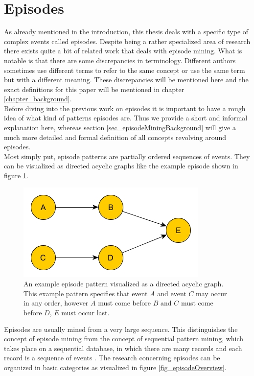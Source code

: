\section{Episodes}
\label{sec_episodes}
As already mentioned in the introduction, this thesis deals with a specific type of complex events called episodes. Despite being a rather specialized area of research there exists quite a bit of related work that deals with episode mining. What is notable is that there are some discrepancies in terminology. Different authors sometimes use different terms to refer to the same concept or use the same term but with  a different meaning. These discrepancies will be mentioned here and the exact definitions for this paper will be mentioned in chapter \ref{chapter_background}. \\
Before diving into the previous work on episodes it is important to have a rough idea of what kind of patterns episodes are. Thus we provide a short and informal explanation here, whereas section \ref{sec_episodeMiningBackground} will give a much more detailed and formal definition of all concepts revolving around episodes. \\
Most simply put, episode patterns are partially ordered sequences of events. They can be visualized as directed acyclic graphs like the example episode shown in figure \ref{fig_exampleCompositeEpisode}. 

\begin{figure}[h]
	\centering
  	\includegraphics[width=.4\textwidth]{exampleCompositeEpisode}
	\caption{An example episode pattern visualized as a directed acyclic graph. This example pattern specifies that event $A$ and event $C$ may occur in any order, however $A$ must come before $B$ and $C$ must come before $D$, $E$ must occur last.}
	\label{fig_exampleCompositeEpisode}
\end{figure}

Episodes are usually mined from a very large sequence. This distinguishes the concept of episode mining from the concept of sequential pattern mining, which takes place on a sequential database, in which there are many records and each record is a sequence of events \cite{wu2013mining}.
The research concerning episodes can be organized in basic categories as visualized in figure \ref{fig_episodeOverview}.

